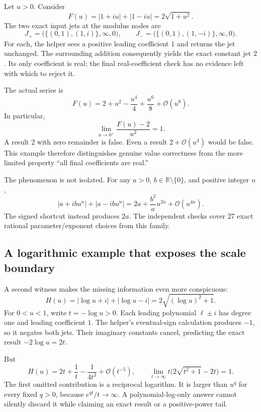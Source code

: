 \documentclass[11pt,a4paper]{article}
\newcommand{\OO}{\mathcal O}
\newcommand{\RR}{\mathbb R}
\begin{document}
Let $u>0$. Consider
\begin{equation}\label{eq:unit}
 F(u)=|1+i u|+|1-i u|=2\sqrt{1+u^2}.
\end{equation}
The two exact input jets at the modulus nodes are
\[
 J_+=\bigl(\{(0,1),(1,i)\},\infty,0\bigr),\qquad
 J_-=\bigl(\{(0,1),(1,-i)\},\infty,0\bigr).
\]
For each, the helper sees a positive leading coefficient $1$ and returns the jet unchanged. The surrounding addition consequently yields the exact constant jet $2$. Its only coefficient is real; the final real-coefficient check has no evidence left with which to reject it.

The actual series is
\begin{equation}\label{eq:unitexp}
 F(u)=2+u^2-\frac{u^4}{4}+\frac{u^6}{8}+\OO(u^8).
\end{equation}
In particular,
\[
 \lim_{u\to0^+}\frac{F(u)-2}{u^2}=1.
\]
A result $2$ with zero remainder is false. Even a result $2+\OO(u^4)$ would be false. This example therefore distinguishes genuine value correctness from the more limited property ``all final coefficients are real.''

The phenomenon is not isolated. For any $a>0$, $b\in\RR\setminus\{0\}$, and positive integer $n$,
\[
 |a+i b u^n|+|a-i b u^n|
 =2a+\frac{b^2}{a}u^{2n}+\OO(u^{4n}).
\]
The signed shortcut instead produces $2a$. The independent checks cover 27 exact rational parameter/exponent choices from this family.

\subsection{A logarithmic example that exposes the scale boundary}

A second witness makes the missing information even more conspicuous:
\begin{equation}\label{eq:logwitness}
 H(u)=|\log u+i|+|\log u-i|
     =2\sqrt{(\log u)^2+1}.
\end{equation}
For $0<u<1$, write $t=-\log u>0$. Each leading polynomial $\ell\pm i$ has degree one and leading coefficient $1$. The helper's eventual-sign calculation produces $-1$, so it negates both jets. Their imaginary constants cancel, predicting the exact result $-2\log u=2t$.

But
\[
 H(u)=2t+\frac1t-\frac1{4t^3}+\OO(t^{-5}),\qquad
 \lim_{t\to\infty}t\bigl(2\sqrt{t^2+1}-2t\bigr)=1.
\]
The first omitted contribution is a reciprocal logarithm. It is larger than $u^q$ for every fixed $q>0$, because $e^{qt}/t\to\infty$. A polynomial-log-only answer cannot silently discard it while claiming an exact result or a positive-power tail.
\end{document}
